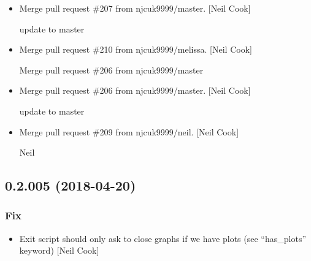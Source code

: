 \documentclass[a4paper,10pt,english]{report}
\begin{document}
\begin{itemize}
\item {} 
Merge pull request \#207 from njcuk9999/master. {[}Neil Cook{]}

update to master

\item {} 
Merge pull request \#210 from njcuk9999/melissa. {[}Neil Cook{]}

Merge pull request \#206 from njcuk9999/master

\item {} 
Merge pull request \#206 from njcuk9999/master. {[}Neil Cook{]}

update to master

\item {} 
Merge pull request \#209 from njcuk9999/neil. {[}Neil Cook{]}

Neil

\end{itemize}


\subsection{0.2.005 (2018-04-20)}
\label{\detokenize{misc/changelog:id455}}

\subsubsection{Fix}
\label{\detokenize{misc/changelog:fix}}\begin{itemize}
\item {} 
Exit script should only ask to close graphs if we have plots (see
“has\_plots” keyword) {[}Neil Cook{]}

\end{itemize}
\end{document}
